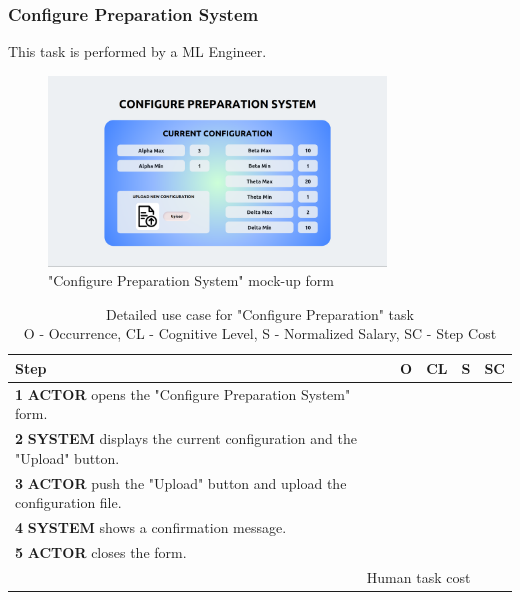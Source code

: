 \subsubsection{Configure Preparation System}
This task is performed by a ML Engineer.

\begin{figure}[H]
\centering
\includegraphics[width=0.8\textwidth]{figures/ui_configure_preparation.png}
\caption{"Configure Preparation System" mock-up form}
\end{figure}

\begin{table}[H]
\centering
\begin{tabularx}{\textwidth}{|X|c|c|c|c|}
\hline
\textbf{Step} & \textbf{O} & \textbf{CL} & \textbf{S} & \textbf{SC} \\
\hline
\textbf{1} \textbf{ACTOR} opens the "Configure Preparation System" form. &  & & & \\
\hline
\textbf{2} \textbf{SYSTEM} displays the current configuration and the "Upload" button.& & & & \\
\hline
\textbf{3} \textbf{ACTOR} push the "Upload" button and upload the configuration file. & & & &\\
\hline
\textbf{4} \textbf{SYSTEM} shows a confirmation message. & & & & \\
\hline
\textbf{5} \textbf{ACTOR} closes the form. & & & & \\
\hline
\multicolumn{4}{|r|}{Human task cost} & \\
\hline
\end{tabularx}
\caption{Detailed use case for "Configure Preparation" task\\ 
O - Occurrence, CL - Cognitive Level, S - Normalized Salary, SC - Step Cost}
\label{table:configure_preparation_system}
\end{table}